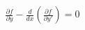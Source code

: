 \documentclass[preview]{standalone}
\begin{document}
\begin{align*}
\frac{\partial f}{\partial y} - \frac{d}{dx}\left(\frac{\partial f}{\partial y'}\right) = 0
\end{align*}
\end{document}
